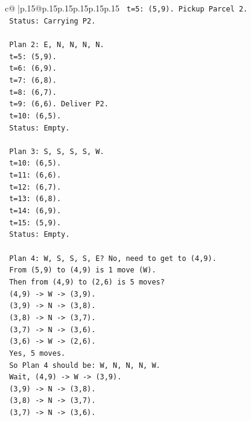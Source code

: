 \documentclass{article}
\begin{document}
{\begin{supertabular}{c@{$\;$}|p{.15\linewidth}@{}p{.15\linewidth}p{.15\linewidth}p{.15\linewidth}p{.15\linewidth}p{.15\linewidth}}
{{{\texttt{      t=5: (5,9). Pickup Parcel 2.} \\
\texttt{      Status: Carrying P2.} \\
\\ 
\texttt{      Plan 2: E, N, N, N, N.} \\
\texttt{      t=5: (5,9).} \\
\texttt{      t=6: (6,9).} \\
\texttt{      t=7: (6,8).} \\
\texttt{      t=8: (6,7).} \\
\texttt{      t=9: (6,6). Deliver P2.} \\
\texttt{      t=10: (6,5).} \\
\texttt{      Status: Empty.} \\
\\ 
\texttt{      Plan 3: S, S, S, S, W.} \\
\texttt{      t=10: (6,5).} \\
\texttt{      t=11: (6,6).} \\
\texttt{      t=12: (6,7).} \\
\texttt{      t=13: (6,8).} \\
\texttt{      t=14: (6,9).} \\
\texttt{      t=15: (5,9).} \\
\texttt{      Status: Empty.} \\
\\ 
\texttt{      Plan 4: W, S, S, S, E? No, need to get to (4,9).} \\
\texttt{      From (5,9) to (4,9) is 1 move (W).} \\
\texttt{      Then from (4,9) to (2,6) is 5 moves?} \\
\texttt{      (4,9) {-}> W {-}> (3,9).} \\
\texttt{      (3,9) {-}> N {-}> (3,8).} \\
\texttt{      (3,8) {-}> N {-}> (3,7).} \\
\texttt{      (3,7) {-}> N {-}> (3,6).} \\
\texttt{      (3,6) {-}> W {-}> (2,6).} \\
\texttt{      Yes, 5 moves.} \\
\texttt{      So Plan 4 should be: W, N, N, N, W.} \\
\texttt{      Wait, (4,9) {-}> W {-}> (3,9).} \\
\texttt{      (3,9) {-}> N {-}> (3,8).} \\
\texttt{      (3,8) {-}> N {-}> (3,7).} \\
\texttt{      (3,7) {-}> N {-}> (3,6).} \\
}}}
\end{supertabular}}
\end{document}
